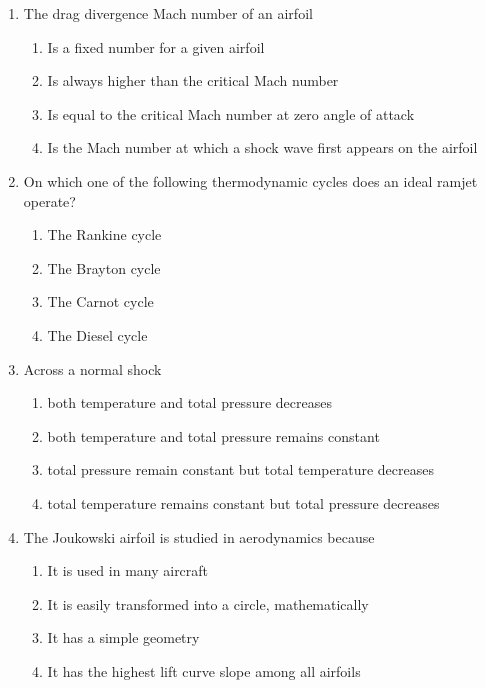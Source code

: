 \documentclass{article}
\begin{document}
\begin{enumerate}
    \item The drag divergence Mach number of an airfoil 
    \begin{enumerate}
        \item Is a fixed number for a given airfoil
        \item Is always higher than the critical Mach number
        \item Is equal to the critical Mach number at zero angle of attack
        \item Is the Mach number at which a shock wave first appears on the airfoil
    \end{enumerate}
        

    \item On which one of the following thermodynamic cycles does an ideal ramjet operate? 
    \begin{enumerate}
        \item The Rankine cycle
        \item The Brayton cycle
        \item The Carnot cycle
        \item The Diesel cycle 
    \end{enumerate}
        

    \item Across a normal shock 
    \begin{enumerate}
        \item both temperature and total pressure decreases
        \item both temperature and total pressure remains constant
        \item total pressure remain constant but total temperature decreases
        \item total temperature remains constant but total pressure decreases
    \end{enumerate}
        

    \item The Joukowski airfoil is studied in aerodynamics because 
    \begin{enumerate}
        \item It is used in many aircraft
        \item It is easily transformed into a circle, mathematically
        \item It has a simple geometry
        \item It has the highest lift curve slope among all airfoils
    \end{enumerate}
        


\end{enumerate}
\end{document}
